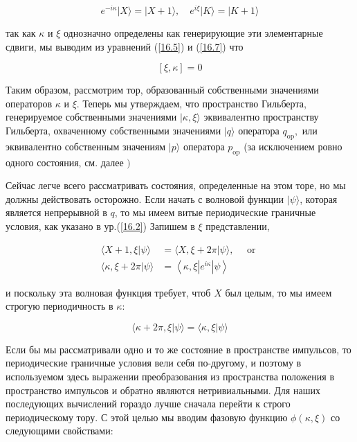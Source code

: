 \documentclass[main.tex]{subfiles}
\begin{document}
\begin{equation}\label{16.7}
e^{-i \kappa}|X\rangle=|X+1\rangle, \quad e^{i \xi}|K\rangle=|K+1\rangle
\end{equation}

так как $\kappa$ и $\xi$ однозначно определены как генерирующие эти элементарные сдвиги, мы выводим из уравнений (\ref{16.5}) и (\ref{16.7}) что

\begin{equation}\label{16.8}
[\xi, \kappa]=0
\end{equation}

Таким образом, рассмотрим тор, образованный собственными значениями операторов $\kappa$ и $\xi .$ Теперь мы утверждаем, что пространство Гильберта, генерируемое собственными значениями $|\kappa, \xi\rangle$ эквивалентно пространству Гильберта, охваченному собственными значениями $|q\rangle$ оператора $q_{\mathrm{op}},$ или эквивалентно собственным значениям $|p\rangle$ оператора $p_{\mathrm{op}}$ (за исключением ровно одного состояния, см. далее $) $

Сейчас легче всего рассматривать состояния, определенные на этом торе, но мы должны действовать осторожно. Если начать с волновой функции $|\psi\rangle$, которая является непрерывной в $q$, то мы имеем витые периодические граничные условия, как указано в ур.(\ref{16.2}) Запишем в $\xi$ представлении,

\begin{equation}\label{16.9}
\begin{aligned}
\langle X+1, \xi | \psi\rangle &=\langle X, \xi+2 \pi | \psi\rangle, \quad \text { or } \\
\langle\kappa, \xi+ 2 \pi | \psi\rangle &=\left\langle\kappa, \xi\left|e^{i \kappa}\right| \psi\right\rangle
\end{aligned}
\end{equation}

и поскольку эта волновая функция требует, чтоб $X$ был целым, то мы имеем строгую периодичность в $\kappa:$

\begin{equation}\label{16.10}
\langle\kappa+ 2 \pi, \xi | \psi\rangle=\langle\kappa, \xi | \psi\rangle
\end{equation}

Если бы мы рассматривали одно и то же состояние в пространстве импульсов, то периодические граничные условия вели себя по-другому, и поэтому в используемом здесь выражении преобразования из пространства положения в пространство импульсов и обратно являются нетривиальными. Для наших последующих вычислений гораздо лучше сначала перейти к строго периодическому тору. С этой целью мы вводим фазовую функцию $\phi(\kappa, \xi)$ со следующими свойствами:
\end{document}
